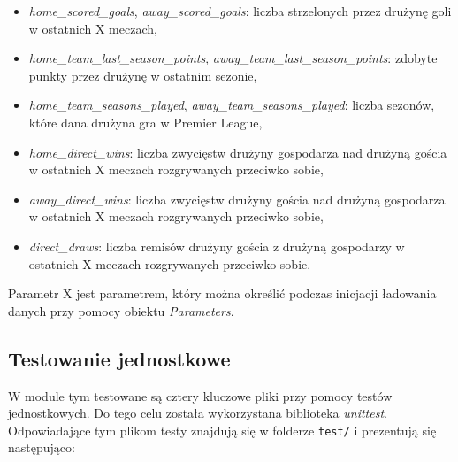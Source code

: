 \begin{itemize}
            \item \emph{home\_scored\_goals}, \emph{away\_scored\_goals}: liczba strzelonych przez drużynę goli w ostatnich X meczach, 
            \item \emph{home\_team\_last\_season\_points}, \emph{away\_team\_last\_season\_points}: zdobyte punkty przez drużynę w ostatnim sezonie, 
            \item \emph{home\_team\_seasons\_played}, \emph{away\_team\_seasons\_played}: liczba sezonów, które dana drużyna gra w Premier League, 
            \item \emph{home\_direct\_wins}: liczba zwycięstw drużyny gospodarza nad drużyną gościa w ostatnich X meczach rozgrywanych przeciwko sobie,
            \item \emph{away\_direct\_wins}: liczba zwycięstw drużyny gościa nad drużyną gospodarza w ostatnich X meczach rozgrywanych przeciwko sobie, 
            \item \emph{direct\_draws}: liczba remisów drużyny gościa z drużyną gospodarzy w ostatnich X meczach rozgrywanych przeciwko sobie. 
        \end{itemize}   
        
        Parametr X jest parametrem, który można określić podczas inicjacji ładowania danych przy pomocy obiektu \emph{Parameters}.
        
        \subsection{Testowanie jednostkowe}
        W module tym testowane są cztery kluczowe pliki przy pomocy testów jednostkowych. Do tego celu została wykorzystana biblioteka \emph{unittest}. Odpowiadające tym plikom testy znajdują się w folderze \texttt{test/} i prezentują się następująco:
        
